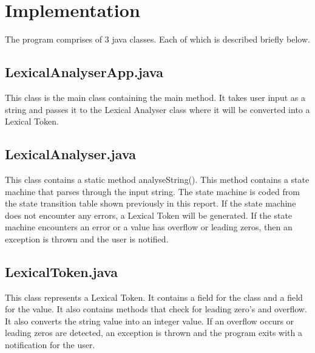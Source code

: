 \documentclass[11pt]{article}
\begin{document}
\newpage
\section{Implementation}
The program comprises of 3 java classes. Each of which is described briefly below.
\subsection{LexicalAnalyserApp.java}
This class is the main class containing the main method. It takes user input as a string and passes it to the Lexical Analyser class where it will be converted into a Lexical Token.
\subsection{LexicalAnalyser.java}
This class contains a static method analyseString(). This method contains a state machine that parses through the input string. The state machine is coded from the state transition table shown previously in this report. If the state machine does not encounter any errors, a Lexical Token will be generated. If the state machine encounters an error or a value has overflow or leading zeros, then an exception is thrown and the user is notified.
\subsection{LexicalToken.java}
This class represents a Lexical Token. It contains a field for the class and a field for the value. It also contains methods that check for leading zero's and overflow. It also converts the string value into an integer value. If an overflow occurs or leading zeros are detected, an exception is thrown and the program exits with a notification for the user.
\end{document}

